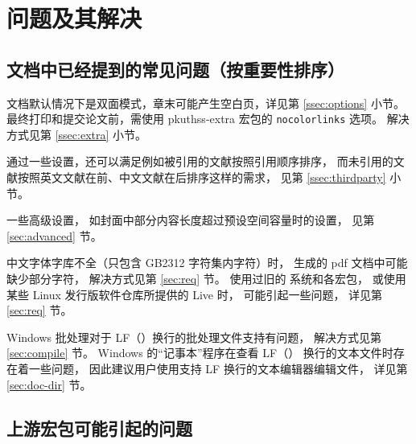 %
%
%
%
%

\chapter{问题及其解决}
	\section{文档中已经提到的常见问题（按重要性排序）}

	文档默认情况下是双面模式，章末可能产生空白页，详见第 \ref{ssec:options} 小节。
	最终打印和提交论文前，需使用 pkuthss-extra 宏包的 \verb|nocolorlinks| 选项。
	解决方式见第 \ref{ssec:extra} 小节。

	通过一些设置，还可以满足例如被引用的文献按照引用顺序排序，
	而未引用的文献按照英文文献在前、中文文献在后排序这样的需求，
	见第 \ref{ssec:thirdparty} 小节。

	一些高级设置，
	如封面中部分内容长度超过预设空间容量时的设置，
	见第 \ref{sec:advanced} 节。

	中文字体字库不全（只包含 GB2312 字符集内字符）时，
	生成的 pdf 文档中可能缺少部分字符，
	解决方式见第 \ref{sec:req} 节。
	使用过旧的  系统和各宏包，
	或使用某些 Linux 发行版软件仓库所提供的  Live 时，
	可能引起一些问题，
	详见第 \ref{sec:req} 节。

	Windows 批处理对于 LF（\texttt{\string\n}）换行的批处理文件支持有问题，
	解决方式见第 \ref{sec:compile} 节。
	Windows 的“记事本”程序在查看 LF（\texttt{\string\n}）
	换行的文本文件时存在着一些问题，
	因此建议用户使用支持 LF 换行的文本编辑器编辑文件，
	详见第 \ref{sec:doc-dir} 节。

	\section{上游宏包可能引起的问题}

